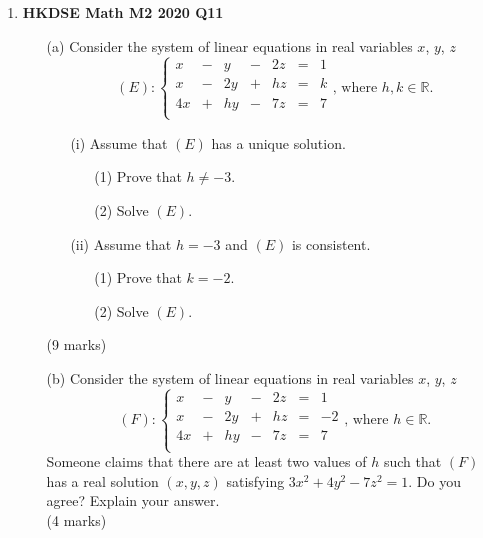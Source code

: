 \documentclass{report}
\begin{document}
\begin{enumerate}
	\item \textbf{HKDSE Math M2 2020 Q11}
	\begin{enumerate}
		\item [(a)] Consider the system of linear equations in real variables $x$, $y$, $z$
		$$(E):\left\{\begin{matrix}
			x&  -& y& -&2z& = & 1  \\
			x&  -&2y& +&hz& = & k \\
			4x& +&hy& -&7z& = & 7 \\
		\end{matrix}\right. \text{, where }h,k \in \mathbb{R}.$$
		\begin{enumerate}
			\item [(i)]Assume that $(E)$ has a unique solution.
			\begin{enumerate}
				\item [(1)]Prove that $h \neq -3$. 
				\item [(2)]Solve $(E)$.
			\end{enumerate}
			\item [(ii)]Assume that $h = -3$ and $(E)$ is consistent.
			\begin{enumerate}
				\item [(1)]Prove that $k = -2$. 
				\item [(2)]Solve $(E)$. 
			\end{enumerate}
		\end{enumerate}
		(9 marks)
		\item[(b)]Consider the system of linear equations in real variables $x$, $y$, $z$
		$$(F):\left\{\begin{matrix}
		x&  -&y&  -&2z& = &1  \\
		x&  -&2y&  +&hz& = & -2 \\
		4x&  +&hy&  -&7z& = & 7 \\
		\end{matrix}\right. \text{, where }h \in \mathbb{R}.$$
		Someone claims that there are at least two values of $h$ such that $(F)$ has a real solution $(x,y,z)$ satisfying $3x^2+4y^2-7z^2=1$. Do you agree? Explain your answer. \\(4 marks)
	\end{enumerate}
	
	\newpage
	

\end{enumerate}
\end{document}
